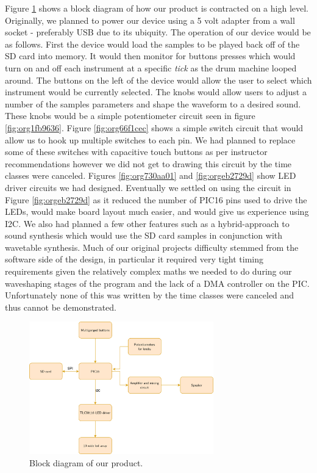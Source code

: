 \documentclass[11pt]{article}
\begin{document}
Figure \ref{fig:org4582cc7} shows a block diagram of how our product is
contracted on a high level. Originally, we planned to power our device
using a 5 volt adapter from a wall socket - preferably USB due to its
ubiquity. The operation of our device would be as follows. First the
device would load the samples to be played back off of the SD card
into memory. It would then monitor for buttons presses which would
turn on and off each instrument at a specific \emph{tick} as the drum
machine looped around. The buttons on the left of the device would
allow the user to select which instrument would be currently
selected. The knobs would allow users to adjust a number of the
samples parameters and shape the waveform to a desired sound. These
knobs would be a simple potentiometer circuit seen in figure
\ref{fig:org1fb9636}. Figure \ref{fig:org66f1cec} shows a simple switch circuit that would
allow us to hook up multiple switches to each pin. We had planned to
replace some of these switches with capacitive touch buttons as per
instructor recommendations however we did not get to drawing this
circuit by the time classes were canceled. Figures \ref{fig:org730aa01} and
\ref{fig:orgeb2729d} show LED driver circuits we had designed. Eventually we
settled on using the circuit in Figure \ref{fig:orgeb2729d} as it reduced the
number of PIC16 pins used to drive the LEDs, would make board layout
much easier, and would give us experience using I2C. We also had
planned a few other features such as a hybrid-approach to sound
synthesis which would use the SD card samples in conjunction with
wavetable synthesis. Much of our original projects difficulty stemmed
from the software side of the design, in particular it required very
tight timing requirements given the relatively complex maths we needed
to do during our waveshaping stages of the program and the lack of
a DMA controller on the PIC. Unfortunately none of this was written by
the time classes were canceled and thus cannot be demonstrated.

\begin{figure}[htbp]
\centering
\includegraphics[width=8cm]{./block_diagram.png}
\caption{\label{fig:org4582cc7}
Block diagram of our product.}
\end{figure}
\end{document}
